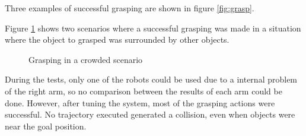 Three examples of successful grasping are shown in figure \ref{fig:grasp}.

Figure \ref{fig:crowded} shows two scenarios where a successful grasping was made in a situation where the object to grasped was surrounded by other objects.
\begin{figure}[H]
	\centering
	\begin{subfigure}
		{\texttt{[image: results/grasp\_crowded2.jpg]}}
	\end{subfigure}
	\begin{subfigure}
		{\texttt{[image: results/grasp\_c2.jpg]}}
	\end{subfigure}
	\vspace{-15pt}
	\caption[Complex Grasping]{Grasping in a crowded scenario}
	\vspace{-10pt}
	\label{fig:crowded}
\end{figure}

During the tests, only one of the robots could be used due to a internal problem of the right arm, so no comparison between the results of each arm could be done. However, after tuning the system, most of the grasping actions were successful. No trajectory executed generated a collision, even when objects were near the goal position.